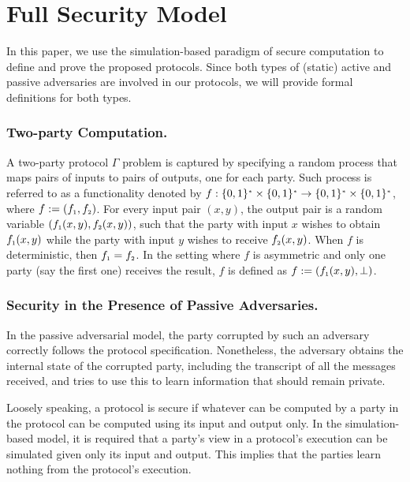 

\section{Full Security Model}\label{sec::sec-model-long}

In this paper, we use the simulation-based paradigm of secure computation \cite{DBLP:books/cu/Goldreich2004} to define and prove the proposed protocols. Since both types of (static) active and passive adversaries are involved in our protocols, we will provide formal definitions for both types. 
%
 
 \vs 
 
 \subsubsection{Two-party Computation.} A two-party protocol $\Gamma$ problem is captured by specifying a random process that maps pairs of inputs to pairs of outputs, one for each party. Such process is referred to as a functionality denoted by  $f:\{0,1\}^{\scriptscriptstyle *}\times\{0,1\}^{\scriptscriptstyle *}\rightarrow\{0,1\}^{\scriptscriptstyle *}\times\{0,1\}^{\scriptscriptstyle *}$, where $f:=(f_{\scriptscriptstyle 1},f_{\scriptscriptstyle 2})$. For every input pair $(x,y)$, the output pair is a random variable $(f_{\scriptscriptstyle 1} (x,y), f_{\scriptscriptstyle 2} (x,y))$, such that the party with input $x$ wishes to obtain $f_{\scriptscriptstyle 1} (x,y)$ while the party with input $y$ wishes to receive $f_{\scriptscriptstyle 2} (x,y)$. When $f$ is deterministic, then $f_{\scriptscriptstyle 1} =f_{\scriptscriptstyle 2}$. In the setting where $f$ is asymmetric and only one party (say the first one) receives the result, $f$ is defined as $f:=(f_{\scriptscriptstyle 1}(x,y), \bot)$. 
 
 \vs
 
 \subsubsection{Security in the Presence of Passive Adversaries.}  In the passive adversarial model, the party corrupted by such an adversary correctly follows the protocol specification. Nonetheless, the adversary obtains the internal state of the corrupted party, including the transcript of all the messages received, and tries to use this to learn information that should remain private. 
 
 Loosely speaking, a protocol is secure if whatever can be computed by a party in the protocol can be computed using its input and output only. In the simulation-based model, it is required that a party’s view in a protocol's 
 execution can be simulated given only its input and output. This implies that the parties learn nothing from the protocol's execution. 
 
